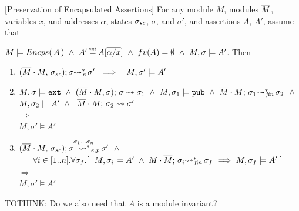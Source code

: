 \begin{auxLemma}
\label{lemma:external_exec_preserves_more}[Preservation of Encapsulated Assertions]
For any module $M$, modules $\overline{M}$, variables $\overline x$, and addresses $\overline \alpha$,
 states $\sigma_{sc}$, $\sigma$, and $\sigma'$, and assertions $A$, $A'$, 
assume that

\noindent
 $M \models \encaps A \   \wedge  \ A'\txteq A[\overline{\alpha/x}]\  \wedge \ fv(A)=\emptyset \  \wedge \ 
M, \sigma \models  A' $. Then

\begin{enumerate}

\item
$   (\overline{M}\cdot M,\, {\sigma_{sc}}); \sigma{\rightsquigarrow^*}\!\!_{e}\, \sigma' 
\ \ \Longrightarrow \ \ \ M, \sigma' \models A'$

\item
$M, \sigma  \models \mbox{\normalfont{\texttt{ext}}} \ \wedge \  (\overline{M}\cdot M, \sigma);\, {\sigma} \rightsquigarrow \sigma_{1} \ \wedge
 \ M, \sigma_1 \models \mbox{\normalfont{\texttt{pub}}} \ \wedge\  \overline{M}\cdot M;\, {\sigma_1} {\rightsquigarrow^*}\!\!_{\mathit{fin}}\, \sigma_2    \ \ \wedge$\\
$ M, \sigma_2 \models A' \ \wedge \ 
  \   \leadstoBounded  {\Mtwo\cdot M} {\sigma_2}      {\sigma'}$\\
 $\Longrightarrow $
\\
$M, \sigma' \models A' $

\item
$ \WithExtPub {\Mtwo\cdot M} {\sigma\bd}  {\sigma}  {\sigma'} {\sigma_1...\sigma_n}\ \ \wedge $\\
 $\strut \ \ \ \  \  \forall i\in [1..n]. \forall \sigma_{f}.[ \ \  M, \sigma_i \models A'  \ \wedge \  \leadstoBoundedStarFin {M\cdot \Mtwo}  {\sigma_i}  {\sigma_{f}} \ 
\Longrightarrow \  M, \sigma_f \models A' \ ]$\\
$\Longrightarrow $
\\
$M, \sigma' \models A' $
\end{enumerate}

TOTHINK: Do we also need that $A$ is a module invariant?
\end{auxLemma}


